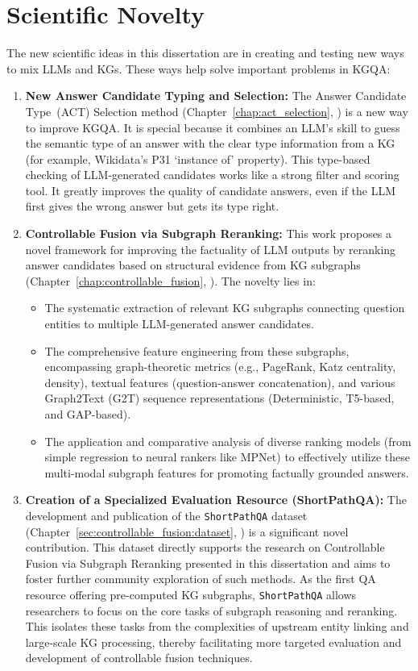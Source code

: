 \section{Scientific Novelty}
\label{sec:intro:novelty}
The new scientific ideas in this dissertation are in creating and testing new ways to mix LLMs and KGs. These ways help solve important problems in KGQA:
\begin{enumerate}
    \item \textbf{New Answer Candidate Typing and Selection:} The Answer Candidate Type~(ACT) Selection method (Chapter~\ref{chap:act_selection}, \cite{DBLP:journals/corr/abs-2310-07008}) is a new way to improve KGQA. It is special because it combines an LLM's skill to guess the semantic type of an answer with the clear type information from a KG (for example, Wikidata's P31 `instance of' property). This type-based checking of LLM-generated candidates works like a strong filter and scoring tool. It greatly improves the quality of candidate answers, even if the LLM first gives the wrong answer but gets its type right.
    \item \textbf{Controllable Fusion via Subgraph Reranking:} This work proposes a novel framework for improving the factuality of LLM outputs by reranking answer candidates based on structural evidence from KG subgraphs (Chapter~\ref{chap:controllable_fusion}, \cite{DBLP:journals/corr/abs-2310-02166}). The novelty lies in:
    \begin{itemize}
        \item The systematic extraction of relevant KG subgraphs connecting question entities to multiple LLM-generated answer candidates.
        \item The comprehensive feature engineering from these subgraphs, encompassing graph-theoretic metrics (e.g., PageRank, Katz centrality, density), textual features (question-answer concatenation), and various Graph2Text (G2T) sequence representations (Deterministic, T5-based, and GAP-based).
        \item The application and comparative analysis of diverse ranking models (from simple regression to neural rankers like MPNet) to effectively utilize these multi-modal subgraph features for promoting factually grounded answers.
    \end{itemize}
    \item \textbf{Creation of a Specialized Evaluation Resource (ShortPathQA):} The development and publication of the \texttt{ShortPathQA} dataset (Chapter~\ref{sec:controllable_fusion:dataset}, \cite{DBLP:conf/nldb/SalnikovSPQA25}) is a significant novel contribution. This dataset directly supports the research on Controllable Fusion via Subgraph Reranking presented in this dissertation and aims to foster further community exploration of such methods. As the first QA resource offering pre-computed KG subgraphs, \texttt{ShortPathQA} allows researchers to focus on the core tasks of subgraph reasoning and reranking. This isolates these tasks from the complexities of upstream entity linking and large-scale KG processing, thereby facilitating more targeted evaluation and development of controllable fusion techniques.
\end{enumerate}

